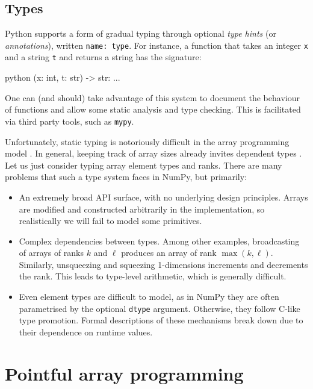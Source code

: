 \subsection{Types}

Python supports a form of gradual typing through optional \textit{type hints} (or \textit{annotations}), written \texttt{name: type}. For instance, a function that takes an integer \texttt{x} and a string \texttt{t} and returns a string has the signature:
\begin{center}
\begin{cminted}{python}
(x: int, t: str) -> str: ...
\end{cminted}
\end{center}
One can (and should) take advantage of this system to document the behaviour of functions and allow some static analysis and type checking. This is facilitated via third party tools, such as \texttt{mypy}.

Unfortunately, static typing is notoriously difficult in the array programming model \cite{liu2020type}. In general, keeping track of array sizes already invites dependent types \cite{henriksen2021towards}. Let us just consider typing array element types and ranks. There are many problems that such a type system faces in NumPy, but primarily:
\begin{itemize}
    \item An extremely broad API surface, with no underlying design principles. Arrays are modified and constructed arbitrarily in the implementation, so realistically we will fail to model some primitives.
    \item Complex dependencies between types. Among other examples, broadcasting of arrays of ranks $k$ and $\ell$ produces an array of rank $\max(k, \ell)$. Similarly, unsqueezing and squeezing 1-dimensions increments and decrements the rank. This leads to type-level arithmetic, which is generally difficult.
    \item Even element types are difficult to model, as in NumPy they are often parametrised by the optional \texttt{dtype} argument. Otherwise, they follow C-like type promotion. Formal descriptions of these mechanisms break down due to their  dependence on runtime values.
\end{itemize}

\section{Pointful array programming}
\label{pointful-array-programming}

